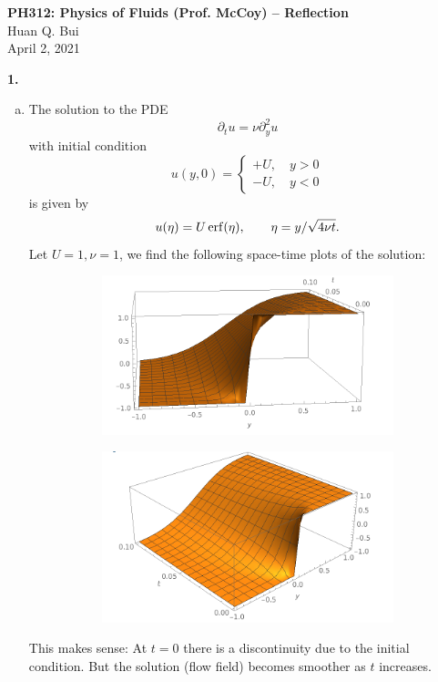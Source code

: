 \documentclass[11pt]{article}
\newcommand{\p}{\partial}%
\begin{document}
\begin{center}
{\large \bf PH312: Physics of Fluids (Prof. McCoy) -- Reflection}\\
{ Huan Q. Bui}\\
April 2, 2021
\end{center}



\noindent \textbf{1.}


\begin{enumerate}[(a)]
	\item The solution to the PDE
	\begin{equation*}
	\p_t u = \nu \p^2_y u 
	\end{equation*}
	with initial condition
	\begin{equation*}
	u(y,0) = \begin{cases}
	+U,\quad y>0 \\
	-U,\quad  y < 0
	\end{cases}
	\end{equation*}
	is given by 
	\begin{equation*}
	u(\eta) = U \erf(\eta), \quad\quad \eta = y/\sqrt{4\nu t}.
	\end{equation*}
	Let $U = 1, \nu = 1$, we find the following space-time plots of the solution:
	\begin{figure}[!htb]
		\centering
		\begin{subfigure}{0.49\textwidth}
			\includegraphics[scale=0.75]{1a_1}
		\end{subfigure}
		\begin{subfigure}{0.49\textwidth}
			\includegraphics[scale=0.75]{1a_2}
		\end{subfigure}
	\end{figure}
	This makes sense: At $t=0$ there is a discontinuity due to the initial condition. But the solution (flow field) becomes smoother as $t$ increases. \\
	

\end{enumerate}
\end{document}
